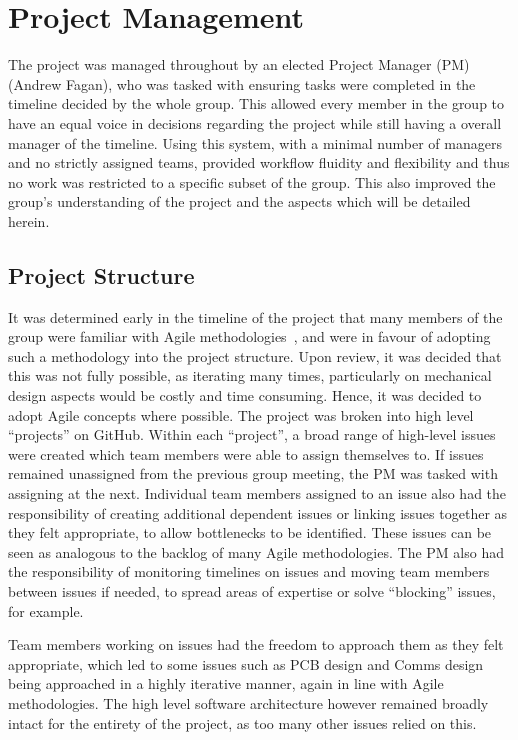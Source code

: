 \chapter{Project Management}\label{pm}

The project was managed throughout by an elected Project Manager (PM)
(Andrew Fagan), who was tasked with ensuring tasks were
completed in the timeline decided by the whole group. This
allowed every member in the group to have an equal voice in
decisions regarding the project while still having a overall
manager of the timeline. Using this system, with a minimal
number of managers and no strictly assigned teams, provided
workflow fluidity and flexibility and thus no work was restricted
to a specific subset of the group. This also improved the
group's understanding of the project and the aspects
which will be detailed herein.

\section{Project Structure}\label{pm/structure}

It was determined early in the timeline of the project that many members of the
group were familiar with Agile methodologies~\cite{agilemeth}, and were in favour of
adopting such a methodology into the project structure. Upon review, it was
decided that this was not fully possible, as iterating many times, particularly on
mechanical design aspects would be costly and time consuming. Hence, it was
decided to adopt Agile concepts where possible. The project was broken into high
level ``projects'' on GitHub. Within each ``project'', a broad range of high-level
issues were created which team members were able to assign themselves to. If
issues remained unassigned from the previous group meeting, the PM was tasked with
assigning at the next. Individual team members assigned to an issue also had the
responsibility of creating additional dependent issues or linking issues together
as they felt appropriate, to allow bottlenecks to be identified. These issues can
be seen as analogous to the backlog of many Agile methodologies. The PM also had
the responsibility of monitoring timelines on issues and moving team members
between issues if needed, to spread areas of expertise or solve ``blocking''
issues, for example.

Team members working on issues had the freedom to approach them as they felt
appropriate, which led to some issues such as PCB design and Comms design being
approached in a highly iterative manner, again in line with Agile methodologies.
The high level software architecture however remained broadly intact for the
entirety of the project, as too many other issues relied on this.

